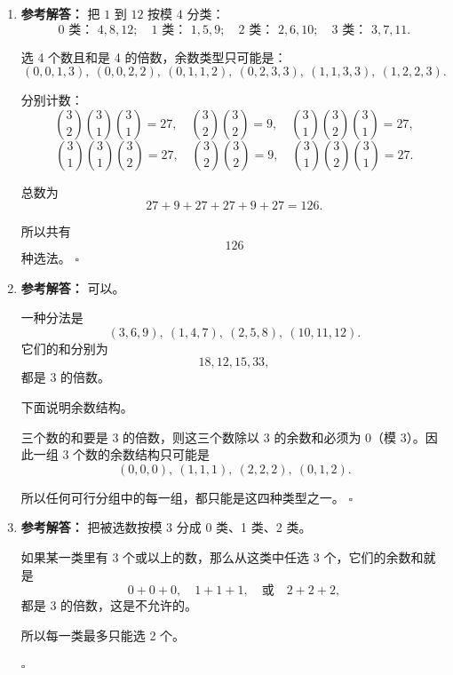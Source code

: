 \documentclass[11pt,a4paper,fontset=fandol]{ctexart}
\newenvironment{solution}{\par\noindent\textbf{参考解答：}}{\hfill$\square$\par}
\begin{document}
\begin{enumerate}
\begin{solution}
  再看 9 步。

  每走一步，坐标和 $x+y$ 的奇偶性都会改变一次。起点 $(0,0)$ 的坐标和是 0，为偶数；终点 $(4,4)$ 的坐标和是 8，也为偶数。

  从偶数奇偶性回到偶数奇偶性，必须走偶数步，所以走 9 步不可能到达。

  结论：8 步可以，9 步不可以。
  \end{solution}

  \item \begin{solution}
  把 $1$ 到 $12$ 按模 $4$ 分类：
  \[
  0\text{ 类： }4,8,12;\quad 1\text{ 类： }1,5,9;\quad 2\text{ 类： }2,6,10;\quad 3\text{ 类： }3,7,11.
  \]

  选 4 个数且和是 4 的倍数，余数类型只可能是：
  \[
  (0,0,1,3),\ (0,0,2,2),\ (0,1,1,2),\ (0,2,3,3),\ (1,1,3,3),\ (1,2,2,3).
  \]

  分别计数：
  \[
  \binom32\binom31\binom31=27,
  \quad
  \binom32\binom32=9,
  \quad
  \binom31\binom32\binom31=27,
  \]
  \[
  \binom31\binom31\binom32=27,
  \quad
  \binom32\binom32=9,
  \quad
  \binom31\binom32\binom31=27.
  \]

  总数为
  \[
  27+9+27+27+9+27=126.
  \]

  所以共有
  \[
  126
  \]
  种选法。
  \end{solution}

  \item \begin{solution}
  可以。

  一种分法是
  \[
  (3,6,9),\ (1,4,7),\ (2,5,8),\ (10,11,12).
  \]
  它们的和分别为
  \[
  18,12,15,33,
  \]
  都是 3 的倍数。

  下面说明余数结构。

  三个数的和要是 3 的倍数，则这三个数除以 3 的余数和必须为 0（模 3）。因此一组 3 个数的余数结构只可能是
  \[
  (0,0,0),\ (1,1,1),\ (2,2,2),\ (0,1,2).
  \]

  所以任何可行分组中的每一组，都只能是这四种类型之一。
  \end{solution}

  \item \begin{solution}
  把被选数按模 3 分成 0 类、1 类、2 类。

  如果某一类里有 3 个或以上的数，那么从这类中任选 3 个，它们的余数和就是
  \[
  0+0+0,\quad 1+1+1,\quad \text{或}\quad 2+2+2,
  \]
  都是 3 的倍数，这是不允许的。

  所以每一类最多只能选 2 个。


\end{solution}
\end{enumerate}
\end{document}

